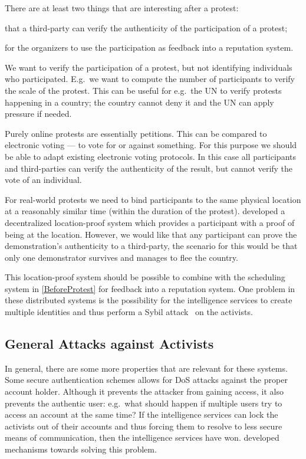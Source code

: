 \documentclass[a4paper]{llncs}
\begin{document}
There are at least two things that are interesting after a protest:
\begin{inparaenum}[(a)]
\item that a third-party can verify the authenticity of the participation of 
  a protest;
\item for the organizers to use the participation as feedback into a reputation 
  system.
\end{inparaenum}
We want to verify the participation of a protest, but not identifying 
individuals who participated.
E.g.\ we want to compute the number of participants to verify the scale of the 
protest.
This can be useful for e.g.\ the UN to verify protests happening in a country; 
the country cannot deny it and the UN can apply pressure if needed.

Purely online protests are essentially petitions.
This can be compared to electronic voting --- to vote for or against something.
For this purpose we should be able to adapt existing electronic voting 
protocols.
In this case all participants and third-parties can verify the authenticity of 
the result, but cannot verify the vote of an individual.

For real-world protests we need to bind participants to the same physical 
location at a reasonably similar time (within the duration of the protest).
\citet{PROPS} developed a decentralized location-proof system which provides 
a participant with a proof of being at the location.
However, we would like that any participant can prove the demonstration's 
authenticity to a third-party, the scenario for this would be that only one 
demonstrator survives and manages to flee the country.

This location-proof system should be possible to combine with the scheduling 
system in \cref{BeforeProtest} for feedback into a reputation system.
One problem in these distributed systems is the possibility for the 
intelligence services to create multiple identities and thus perform a Sybil 
attack~\cite{SybilAttack} on the activists.

\subsection{General Attacks against Activists}
\label{GeneralAttacks}

In general, there are some more properties that are relevant for these systems.
Some secure authentication schemes allows for \ac{DoS} attacks against the 
proper account holder.
Although it prevents the attacker from gaining access, it also prevents the 
authentic user:
e.g.\ what should happen if multiple users try to access an account at the same 
time?
If the intelligence services can lock the activists out of their accounts and 
thus forcing them to resolve to less secure means of communication, then the 
intelligence services have won.
\citet{P2PPasswords} developed mechanisms towards solving this problem.
\end{document}

